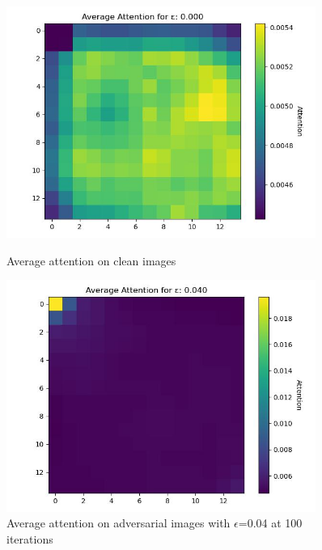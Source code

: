 \begin{figure}
    \centering
    \begin{minipage}{0.45\textwidth}
        \centering
        \includegraphics[width=0.9\textwidth]{figures/distraction_attention_epsilon_0.png} %
        \caption{Average attention on clean images}
        \label{average_attention_clean}
    \end{minipage}\hfill
    \begin{minipage}{0.45\textwidth}
        \centering
        \includegraphics[width=0.9\textwidth]{figures/distraction_attention_epsilon_0.04.png} %
        \caption{Average attention on adversarial images with $\epsilon$=0.04 at 100 iterations}
        \label{average_attention_adv}
    \end{minipage}
\end{figure}

